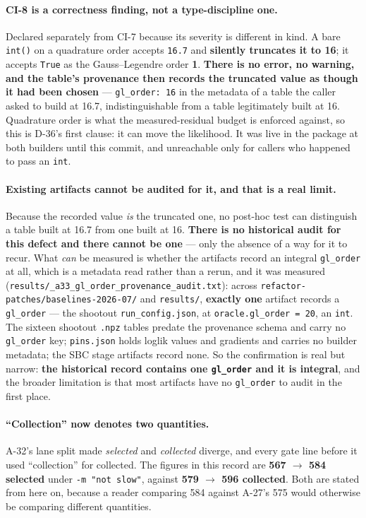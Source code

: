 \documentclass[
  10pt,
]{article}
\begin{document}
\paragraph{CI-8 is a correctness finding, not a type-discipline one.}
Declared separately from CI-7 because its severity is different in kind. A bare \texttt{int()} on a quadrature order accepts \texttt{16.7} and \textbf{silently truncates it to 16}; it accepts \texttt{True} as the Gauss--Legendre order \textbf{1}. \textbf{There is no error, no warning, and the table's provenance then records the truncated value as though it had been chosen} --- \texttt{gl\_order: 16} in the metadata of a table the caller asked to build at 16.7, indistinguishable from a table legitimately built at 16. Quadrature order is what the measured-residual budget is enforced against, so this is D-36's first clause: it can move the likelihood. It was live in the package at both builders until this commit, and unreachable only for callers who happened to pass an \texttt{int}.

\paragraph{Existing artifacts cannot be audited for it, and that is a real limit.}
Because the recorded value \emph{is} the truncated one, no post-hoc test can distinguish a table built at 16.7 from one built at 16. \textbf{There is no historical audit for this defect and there cannot be one} --- only the absence of a way for it to recur. What \emph{can} be measured is whether the artifacts record an integral \texttt{gl\_order} at all, which is a metadata read rather than a rerun, and it was measured (\texttt{results/\allowbreak{}\_a33\_gl\_order\_provenance\_audit.txt}): across \texttt{refactor-patches/\allowbreak{}baselines-2026-07/} and \texttt{results/}, \textbf{exactly one} artifact records a \texttt{gl\_order} --- the shootout \texttt{run\_config.json}, at \texttt{oracle.gl\_order = 20}, an \texttt{int}. The sixteen shootout \texttt{.npz} tables predate the provenance schema and carry no \texttt{gl\_order} key; \texttt{pins.json} holds loglik values and gradients and carries no builder metadata; the SBC stage artifacts record none. So the confirmation is real but narrow: \textbf{the historical record contains one \texttt{gl\_order} and it is integral}, and the broader limitation is that most artifacts have no \texttt{gl\_order} to audit in the first place.

\paragraph{``Collection'' now denotes two quantities.}
A-32's lane split made \emph{selected} and \emph{collected} diverge, and every gate line before it used ``collection'' for collected. The figures in this record are \textbf{567 $\rightarrow$ 584 selected} under \texttt{-m "not slow"}, against \textbf{579 $\rightarrow$ 596 collected}. Both are stated from here on, because a reader comparing 584 against A-27's 575 would otherwise be comparing different quantities.
\end{document}
